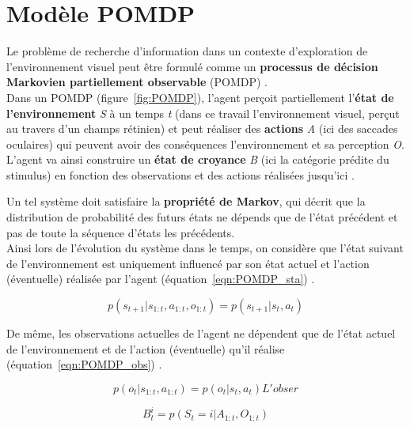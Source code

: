 \section{Modèle POMDP} %
Le problème de recherche d'information dans un contexte d'exploration de l'environnement visuel peut être formulé comme un \textbf{processus de décision Markovien partiellement observable} (POMDP) \autocite{Butko2010}. \\
Dans un POMDP (figure~\ref{fig:POMDP}), l'agent perçoit partiellement l'\textbf{état de l'environnement} \textit{S} à un temps \textit{t} (dans ce travail l'environnement visuel, perçut au travers d'un champs rétinien) et peut réaliser des \textbf{actions} \textit{A} (ici des saccades oculaires) qui peuvent avoir des conséquences l'environnement et sa perception \textit{O}. L'agent va ainsi construire un \textbf{état de croyance} \textit{B} (ici la catégorie prédite du stimulus) en fonction des observations et des actions réalisées jusqu'ici \autocite{Butko2010}.

Un tel système doit satisfaire la \textbf{propriété de Markov}, qui décrit que la distribution de probabilité des futurs états ne dépends que de l'état précédent et pas de toute la séquence d'états les précédents.\\
Ainsi lors de l'évolution du système dans le temps, on considère que l'état suivant de l'environnement est uniquement influencé par son état actuel et l'action (éventuelle) réalisée par l'agent (équation~\ref{eqn:POMDP_sta}) \autocite{Butko2010}. 

\begin{equation}
p(s_{t+1}|s_{1:t},a_{1:t},o_{1:t}) = p(s_{t+1}|s_{t},a_{t})
\label{eqn:POMDP_sta}
\end{equation}

De même, les observations actuelles de l'agent ne dépendent que de l'état actuel de l'environnement et de l'action (éventuelle) qu'il réalise (équation~\ref{eqn:POMDP_obs}) \autocite{Butko2010}.

\begin{equation}
p(o_{t}|s_{1:t},a_{1:t}) = p(o_{t}|s_{t},a_{t})L'obser
\label{eqn:POMDP_obs}
\end{equation}

\begin{equation}
B_{t}^i = p(S_{t} = i|A_{1:t},O_{1:t})
\label{eqn:POMDP_bel}
\end{equation}



